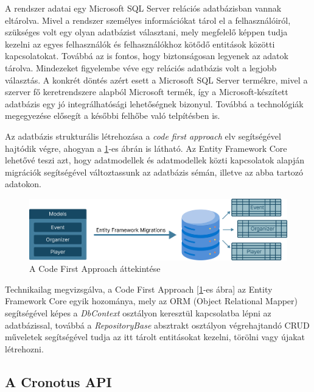 A rendszer adatai egy Microsoft SQL Server relációs adatbázisban\cite{relationaldatabasedocs} vannak eltárolva. Mivel a rendszer személyes információkat tárol el a felhasználóiról, szükséges volt egy olyan adatbázist választani, mely megfelelő képpen tudja kezelni az egyes felhasználók és felhasználókhoz kötődő entitások közötti kapcsolatokat. Továbbá az is fontos, hogy biztonságosan legyenek az adatok tárolva. Mindezeket  figyelembe véve egy relációs adatbázis volt a legjobb választás. A konkrét döntés azért esett a Microsoft SQL Server termékre, mivel a szerver fő keretrendszere alapból Microsoft termék, így a Microsoft-készített adatbázis egy jó integrálhatósági lehetőségnek bizonyul. Továbbá a technológiák megegyezése elősegít a későbbi felhőbe való telpítésben is.

Az adatbázis strukturális létrehozása a \textit{code first approach}\cite{codefirstapproachdocs} elv segítségével hajtódik végre, ahogyan a \ref{fig:code_first_approach}-es ábrán is látható. Az Entity Framework Core lehetővé teszi azt, hogy adatmodellek és adatmodellek közti kapcsolatok alapján migrációk segítségével változtassunk az adatbázis sémán, illetve az abba tartozó adatokon.

\begin{figure}[h]
    \centering
    \includegraphics[width=\textwidth]{./images/code_first_approach.png}
    \caption{A Code First Approach áttekintése}
    \label{fig:code_first_approach}
\end{figure}

Technikailag megvizsgálva, a Code First Approach [\ref{fig:code_first_approach}-es ábra] az Entity Framework Core egyik hozománya, mely az ORM (Object Relational Mapper)\cite{codefirstapproachdocs} segítségével képes a \textit{DbContext} osztályon keresztül kapcsolatba lépni az adatbázissal, továbbá a \textit{RepositoryBase} absztrakt osztályon végrehajtandó CRUD műveletek\cite{crudoperationdocs} segítségével tudja az itt tárolt entitásokat kezelni, törölni vagy újakat létrehozni.

\subsection{A Cronotus API}

